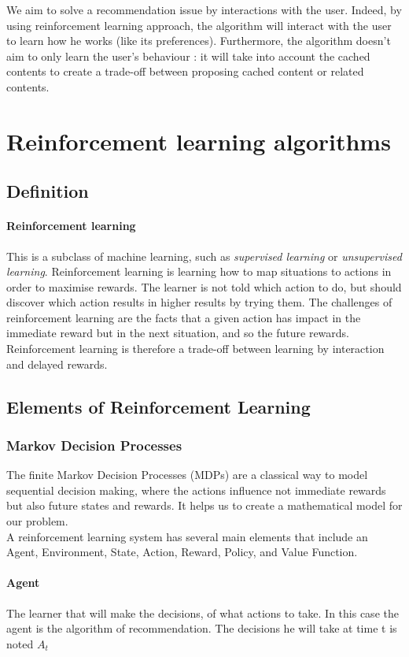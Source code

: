 \documentclass[a4paper]{article}
\begin{document}
We aim to solve a recommendation issue by interactions with the user. Indeed, by using reinforcement learning approach, the algorithm will interact with the user to learn how he works (like its preferences). Furthermore, the algorithm doesn't aim to only learn the user's behaviour : it will take into account the cached contents to create a trade-off between proposing cached content or related contents.

\section{Reinforcement learning algorithms}

\subsection{Definition}

\paragraph{Reinforcement learning} This is a subclass of machine learning, such as \textit{supervised learning} or \textit{unsupervised learning}. Reinforcement learning is learning how to map situations to actions in order to maximise rewards. The learner is not told which action to do, but should discover which action results in higher results by trying them. The challenges of reinforcement learning are the facts that a given action has impact in the immediate reward but in the next situation, and so the future rewards. Reinforcement learning is therefore a trade-off between learning by interaction and delayed rewards. 

\subsection{Elements of Reinforcement Learning}
	\subsubsection{Markov Decision Processes}
	The finite Markov Decision Processes (MDPs) are a classical way to model sequential decision making, where the actions influence not immediate rewards but also future states and rewards. It helps us to create a mathematical model for our problem. \\
A reinforcement learning system has several main elements that include an Agent, Environment, State, Action, Reward, Policy, and Value Function.
\paragraph{Agent}The learner that will make the decisions, of what actions to take. In this case the agent is the algorithm of recommendation. The decisions he will take at time t is noted $A_t$
\end{document}
